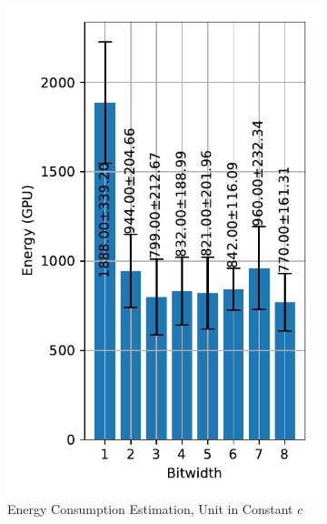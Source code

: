         \begin{figure}[H]
            \centering
            \begin{subfigure}[H]{0.48\textwidth}
                \includegraphics[width=\textwidth]{../standard/FashionMNIST/plots/fashionmnist_train_energy_gpu.pdf}
                \caption{Energy Consumption Estimation, Unit in Constant $c$}
            \end{subfigure}
            \hfill
            \begin{subfigure}[H]{0.48\textwidth}

\end{subfigure}
\end{figure}

